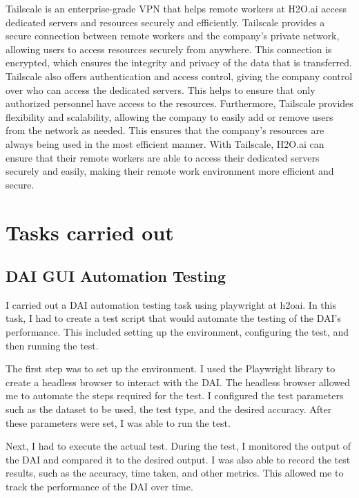 \documentclass[12pt,a4paper]{report}
\begin{document}
Tailscale\cite{tailscale_tailscale_nodate} is an enterprise-grade \ac{VPN} that helps remote workers at H2O.ai access dedicated servers and resources securely and efficiently. Tailscale provides a secure connection between remote workers and the company's private network, allowing users to access resources securely from anywhere. This connection is encrypted, which ensures the integrity and privacy of the data that is transferred. Tailscale also offers authentication and access control, giving the company control over who can access the dedicated servers. This helps to ensure that only authorized personnel have access to the resources. Furthermore, Tailscale provides flexibility and scalability, allowing the company to easily add or remove users from the network as needed. This ensures that the company's resources are always being used in the most efficient manner. With Tailscale, H2O.ai can ensure that their remote workers are able to access their dedicated servers securely and easily, making their remote work environment more efficient and secure.


\section{Tasks carried out}

\subsection{ \ac{DAI} GUI Automation Testing}

I carried out a \ac{DAI} automation testing task using playwright at h2oai. In this task, I had to create a test script that would automate the testing of the \ac{DAI}'s performance. This included setting up the environment, configuring the test, and then running the test. 

The first step was to set up the environment. I used the Playwright library to create a headless browser to interact with the \ac{DAI}. The headless browser allowed me to automate the steps required for the test. I configured the test parameters such as the dataset to be used, the test type, and the desired accuracy. After these parameters were set, I was able to run the test.

Next, I had to execute the actual test. During the test, I monitored the output of the \ac{DAI} and compared it to the desired output. I was also able to record the test results, such as the accuracy, time taken, and other metrics. This allowed me to track the performance of the \ac{DAI} over time.
\end{document}
